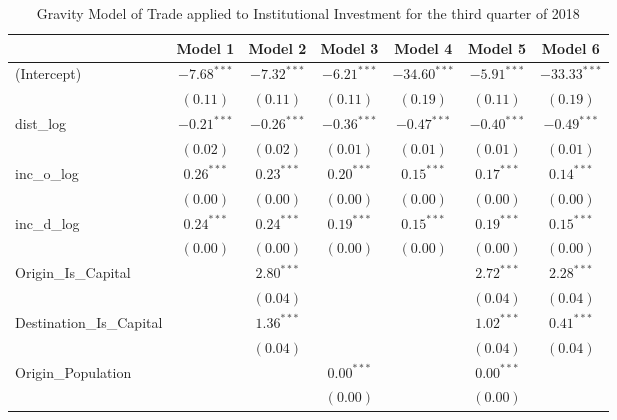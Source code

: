 \begin{table}
	\begin{center}
		\caption[Gravity Model of trade for Q3 2018]{Gravity Model of Trade applied to Institutional Investment for the third quarter of 2018}
		\begin{tabular}{l c c c c c c }
			\hline
			& Model 1 & Model 2 & Model 3 & Model 4 & Model 5 & Model 6 \\
			\hline
			(Intercept)                  & $-7.68^{***}$ & $-7.32^{***}$ & $-6.21^{***}$ & $-34.60^{***}$ & $-5.91^{***}$ & $-33.33^{***}$ \\
			& $(0.11)$      & $(0.11)$      & $(0.11)$      & $(0.19)$       & $(0.11)$      & $(0.19)$       \\
			dist\_log                    & $-0.21^{***}$ & $-0.26^{***}$ & $-0.36^{***}$ & $-0.47^{***}$  & $-0.40^{***}$ & $-0.49^{***}$  \\
			& $(0.02)$      & $(0.02)$      & $(0.01)$      & $(0.01)$       & $(0.01)$      & $(0.01)$       \\
			inc\_o\_log                  & $0.26^{***}$  & $0.23^{***}$  & $0.20^{***}$  & $0.15^{***}$   & $0.17^{***}$  & $0.14^{***}$   \\
			& $(0.00)$      & $(0.00)$      & $(0.00)$      & $(0.00)$       & $(0.00)$      & $(0.00)$       \\
			inc\_d\_log                  & $0.24^{***}$  & $0.24^{***}$  & $0.19^{***}$  & $0.15^{***}$   & $0.19^{***}$  & $0.15^{***}$   \\
			& $(0.00)$      & $(0.00)$      & $(0.00)$      & $(0.00)$       & $(0.00)$      & $(0.00)$       \\
			Origin\_Is\_Capital          &               & $2.80^{***}$  &               &                & $2.72^{***}$  & $2.28^{***}$   \\
			&               & $(0.04)$      &               &                & $(0.04)$      & $(0.04)$       \\
			Destination\_Is\_Capital     &               & $1.36^{***}$  &               &                & $1.02^{***}$  & $0.41^{***}$   \\
			&               & $(0.04)$      &               &                & $(0.04)$      & $(0.04)$       \\
			Origin\_Population           &               &               & $0.00^{***}$  &                & $0.00^{***}$  &                \\
			&               &               & $(0.00)$      &                & $(0.00)$      &                \\

\end{tabular}
\end{center}
\end{table}
